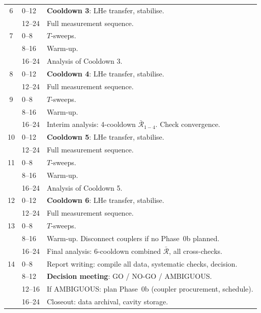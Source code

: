 \documentclass[11pt]{article}
\theoremstyle{definition}
\theoremstyle{remark}
\begin{document}
\begin{tcolorbox}[colback=white, colframe=black,
  title=\textbf{14-DAY CAMPAIGN SCHEDULE}, breakable]
\begin{longtable}{@{}clp{8cm}@{}}
\midrule
6 & 0--12 & \textbf{Cooldown 3}: LHe transfer, stabilise. \\
  & 12--24 & Full measurement sequence. \\

\midrule
7 & 0--8 & $T$-sweeps. \\
  & 8--16 & Warm-up. \\
  & 16--24 & Analysis of Cooldown 3. \\

\midrule
8 & 0--12 & \textbf{Cooldown 4}: LHe transfer, stabilise. \\
  & 12--24 & Full measurement sequence. \\

\midrule
9 & 0--8 & $T$-sweeps. \\
  & 8--16 & Warm-up. \\
  & 16--24 & Interim analysis: 4-cooldown $\bar{\mathcal{R}}_{1-4}$.
  Check convergence. \\

\midrule
10 & 0--12 & \textbf{Cooldown 5}: LHe transfer, stabilise. \\
   & 12--24 & Full measurement sequence. \\

\midrule
11 & 0--8 & $T$-sweeps. \\
   & 8--16 & Warm-up. \\
   & 16--24 & Analysis of Cooldown 5. \\

\midrule
12 & 0--12 & \textbf{Cooldown 6}: LHe transfer, stabilise. \\
   & 12--24 & Full measurement sequence. \\

\midrule
13 & 0--8 & $T$-sweeps. \\
   & 8--16 & Warm-up. Disconnect couplers if no Phase~0b planned. \\
   & 16--24 & Final analysis: 6-cooldown combined
   $\bar{\mathcal{R}}$, all cross-checks. \\

\midrule
14 & 0--8 & Report writing: compile all data, systematic checks,
  decision. \\
   & 8--12 & \textbf{Decision meeting}: GO / NO-GO / AMBIGUOUS. \\
   & 12--16 & If AMBIGUOUS: plan Phase~0b (coupler procurement,
   schedule). \\
   & 16--24 & Closeout: data archival, cavity storage. \\


\end{longtable}
\end{tcolorbox}
\end{document}
